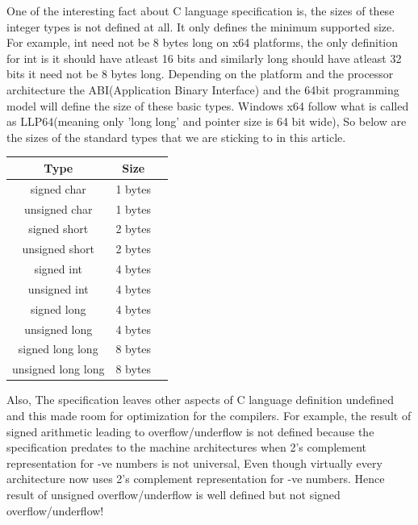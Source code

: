 \documentclass{article}
\begin{document}
One of the interesting fact about C language specification is, the sizes of
these integer types is not defined at all. It only defines the minimum supported
size. For example, int need not be 8 bytes long on x64 platforms, the only
definition for int is it should have atleast 16 bits and similarly long should
have atleast 32 bits it need not be 8 bytes long. Depending on the platform
and the processor architecture the ABI(Application Binary Interface) and the
64bit programming model will define the size of these basic types. Windows x64
follow what is called as LLP64(meaning only 'long long' and pointer size is 64
bit wide), So below are the sizes of the standard types that we are sticking to
in this article.

\begin{center}
\begin{tabular}{|c|c|c|}
 Type       &Size       \\
 \hline
 signed char         & 1 bytes \\
 unsigned char       & 1 bytes \\
 signed short        & 2 bytes \\
 unsigned short      & 2 bytes \\
 signed int          & 4 bytes \\
 unsigned int        & 4 bytes \\
 signed long         & 4 bytes \\
 unsigned long       & 4 bytes \\
 signed long long    & 8 bytes \\
 unsigned long long  & 8 bytes
\end{tabular}
\end{center}

Also, The specification leaves other aspects of C language definition undefined
and this made room for optimization for the compilers.
For example, the result of signed arithmetic leading to overflow/underflow is
not defined because the specification predates to the machine architectures when
2's complement representation for -ve numbers is not universal, Even though
virtually every architecture now uses 2's complement representation for -ve
numbers. Hence result of unsigned overflow/underflow is well defined but not
signed overflow/underflow!
\end{document}
